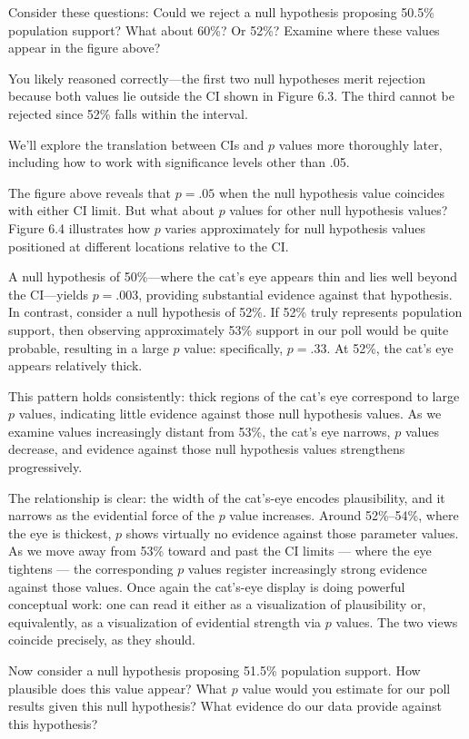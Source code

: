 \documentclass[
  letterpaper,
  DIV=11,
  numbers=noendperiod]{scrreprt}
\begin{document}
Consider these questions: Could we reject a null hypothesis proposing
50.5\% population support? What about 60\%? Or 52\%? Examine where these
values appear in the figure above?

You likely reasoned correctly---the first two null hypotheses merit
rejection because both values lie outside the CI shown in Figure 6.3.
The third cannot be rejected since 52\% falls within the interval.

We'll explore the translation between CIs and \(p\) values more
thoroughly later, including how to work with significance levels other
than .05.

The figure above reveals that \(p = .05\) when the null hypothesis value
coincides with either CI limit. But what about \(p\) values for other
null hypothesis values? Figure 6.4 illustrates how \(p\) varies
approximately for null hypothesis values positioned at different
locations relative to the CI.

A null hypothesis of 50\%---where the cat's eye appears thin and lies
well beyond the CI---yields \(p = .003\), providing substantial evidence
against that hypothesis. In contrast, consider a null hypothesis of
52\%. If 52\% truly represents population support, then observing
approximately 53\% support in our poll would be quite probable,
resulting in a large \(p\) value: specifically, \(p = .33\). At 52\%,
the cat's eye appears relatively thick.

This pattern holds consistently: thick regions of the cat's eye
correspond to large \(p\) values, indicating little evidence against
those null hypothesis values. As we examine values increasingly distant
from 53\%, the cat's eye narrows, \(p\) values decrease, and evidence
against those null hypothesis values strengthens progressively.

The relationship is clear: the width of the cat's-eye encodes
plausibility, and it narrows as the evidential force of the \(p\) value
increases. Around 52\%--54\%, where the eye is thickest, \(p\) shows
virtually no evidence against those parameter values. As we move away
from 53\% toward and past the CI limits --- where the eye tightens ---
the corresponding \(p\) values register increasingly strong evidence
against those values. Once again the cat's-eye display is doing powerful
conceptual work: one can read it either as a visualization of
plausibility or, equivalently, as a visualization of evidential strength
via \(p\) values. The two views coincide precisely, as they should.

Now consider a null hypothesis proposing 51.5\% population support. How
plausible does this value appear? What \(p\) value would you estimate
for our poll results given this null hypothesis? What evidence do our
data provide against this hypothesis?
\end{document}
